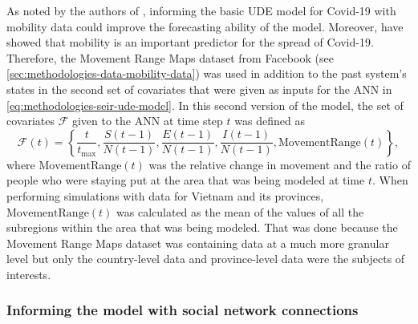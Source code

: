 As noted by the authors of \cite{dandekarMachineLearningAidedGlobal2020a}, informing the basic \gls{UDE} model for Covid-19 with mobility data could improve the forecasting ability of the model.
Moreover, \cite{changMobilityNetworkModels2021,ihmecovid-19forecastingteamModelingCOVID19Scenarios2021,liSubstantialUndocumentedInfection2020} have showed that mobility is an important predictor for the spread of Covid-19.
Therefore, the Movement Range Maps dataset from Facebook (see \autoref{sec:methodologies-data-mobility-data}) was used in addition to the past system's states in the second set of covariates that were given as inputs for the \gls{ANN} in \autoref{eq:methodologies-seir-ude-model}.
In this second version of the model, the set of covariates $\mathcal{F}$ given to the \gls{ANN} at time step $t$ was defined as
\begin{equation*}
    \mathcal{F}(t) = \left\lbrace \frac{t}{t_\text{max}}, \frac{S(t-1)}{N(t-1)}, \frac{E(t-1)}{N(t-1)}, \frac{I(t-1)}{N(t-1)}, \text{MovementRange}(t) \right\rbrace,
\end{equation*}
where $\text{MovementRange}(t)$ was the relative change in movement and the ratio of people who were staying put at the area that was being modeled at time $t$.
When performing simulations with data for Vietnam and its provinces, $\text{MovementRange}(t)$ was calculated as the mean of the values of all the subregions within the area that was being modeled.
That was done because the Movement Range Maps dataset was containing data at a much more granular level but only the country-level data and province-level data were the subjects of interests.

\subsubsection{Informing the model with social network connections}

